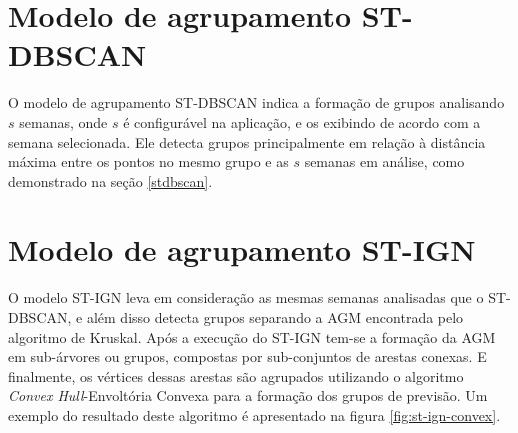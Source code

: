 
\section{Modelo de agrupamento ST-DBSCAN}
O modelo de agrupamento \acrshort{ST-DBSCAN} indica a formação de grupos analisando ${s}$ semanas, onde ${s}$ é configurável na aplicação, e os exibindo de acordo com a semana selecionada. Ele detecta grupos principalmente em relação à distância máxima entre os pontos no mesmo grupo e as ${s}$ semanas em análise, como demonstrado na seção \ref{stdbscan}.

\section{Modelo de agrupamento ST-IGN}
\label{sec:modelo-st-ign}
O modelo \acrshort{ST-IGN} leva em consideração as mesmas semanas analisadas que o \acrshort{ST-DBSCAN}, e além disso detecta grupos separando a \acrshort{AGM} encontrada pelo algoritmo de Kruskal. Após a execução do \acrshort{ST-IGN} tem-se a formação da \acrshort{AGM} em sub-árvores ou grupos, compostas por sub-conjuntos de arestas conexas. E finalmente, os vértices dessas arestas são agrupados utilizando o algoritmo \emph{Convex Hull}-Envoltória Convexa para a formação dos grupos de previsão. Um exemplo do resultado deste algoritmo é apresentado na figura \ref{fig:st-ign-convex}.

\begin{figure}[!ht]
	\centering	
\end{figure}
\FloatBarrier

